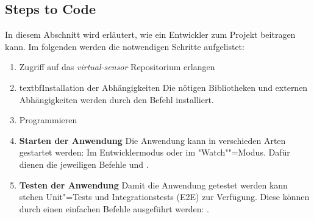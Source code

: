\subsection{Steps to Code}
In diesem Abschnitt wird erläutert, wie ein Entwickler zum Projekt beitragen kann. Im folgenden werden die notwendigen Schritte aufgelistet: 
\begin{enumerate}
	\item Zugriff auf das \textit{virtual-sensor} Repositorium erlangen
	\item textbf{Installation der Abhängigkeiten} \newline
	Die nötigen Bibliotheken und externen Abhängigkeiten werden durch den Befehl  installiert.
	\item Programmieren 
	\item \textbf{Starten der Anwendung} \newline
	Die Anwendung kann in verschieden Arten gestartet werden: Im Entwicklermodus oder im "Watch""=Modus. Dafür dienen die jeweiligen Befehle  und .
	\item \textbf{Testen der Anwendung} \newline
	Damit die Anwendung getestet werden kann stehen Unit"=Tests und Integrationstests (E2E) zur Verfügung. 
	Diese können durch einen einfachen Befehle ausgeführt werden: .
\end{enumerate}

